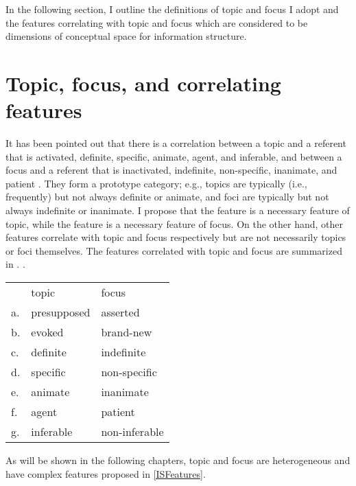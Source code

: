 In the following section,
I outline the definitions of topic and focus I adopt and
the features correlating with topic and focus
which are considered to be dimensions of conceptual space for information structure.

\section{Topic, focus, and correlating features}\label{FrameworkDefinition}

It has been pointed out that
there is a correlation between a topic and
a referent that is activated, definite, specific, animate, agent, and inferable,
and between a focus and
a referent that is inactivated, indefinite, non-specific, inanimate, and patient
\cite{givon76,keenan76,comrie79,comrie83}.
They form a prototype category;
e.g., topics are typically (i.e., frequently) but not always definite or animate, and
foci are typically but not always indefinite or inanimate.
I propose that
the feature  is a necessary feature of topic,
while the feature  is a necessary feature of focus.
On the other hand, other features correlate with topic and focus respectively but are not necessarily topics or foci themselves.
The features correlated with topic and focus are summarized in \Next.
\ex.\label{ISFeatures}
\begin{tabular}{lll}
	 & topic & focus \\
	a. & presupposed & asserted \\
	b. & evoked & brand-new \\
	c. & definite & indefinite \\
	d. & specific & non-specific \\
	e. & animate & inanimate \\
	f. & agent & patient \\
	g. & inferable & non-inferable \\
\end{tabular}

As will be shown in the following chapters,
topic and focus are heterogeneous
and have complex features proposed in \ref{ISFeatures}.

